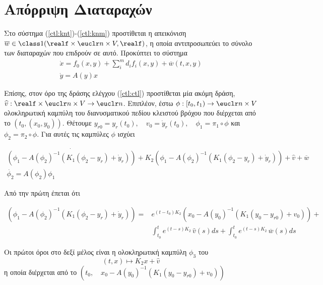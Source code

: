 \section{Απόρριψη Διαταραχών}

\noindent Στο σύστημα (\ref{ctl:knt})-(\ref{ctl:knm}) προστίθεται η απεικόνιση
$\overline{w} \in \class 1(\realf\times\euclr n\times V,\realf)$, η οποία 
αντιπροσωπεύει το σύνολο των διαταραχών που επιδρούν σε αυτό. Προκύπτει το 
σύστημα
\begin{gather}
    \dot{x} = f_{0}(x, y) + \sum_{i}^{m}{d_{i}f_{i}}(x,y) + \overline{w}(t,x,y)
    \label{ctl:knt_} \\
    \dot{y} = A(y)x
    \label{ctl:knm_}   
\end{gather}

Επίσης, στον όρο της δράσης ελέγχου (\ref{ctl:ctl}) προστίθεται μία ακόμη δράση,
$\widehat{v}: \realf\times\euclr n\times V \rightarrow \euclr n$. Επιπλέον,
έστω $\phi:[t_0,t_1)\rightarrow \euclr n \times V$ ολοκληρωτική καμπύλη του
διανυσματικού πεδίου κλειστού βρόχου που διέρχεται από το $\left(t_0,(x_0,y_0)
\right)$. Θέτουμε $y_{r0} = y_r(t_0),\quad v_0 = \dot{y}_r(t_0),\quad \phi_1 = 
\pi_1 \circ \phi$ και $\phi_2 = \pi_2 \circ \phi$. Για αυτές τις καμπύλες $\phi$
ισχύει

\begin{gather}
    \dot{\left(\phi_1 - A(\phi_2)^{-1}\left(K_1(\phi_2 - y_r) +\dot{y}_r\right)
    \right)} + K_2\left(\phi_1 - A(\phi_2)^{-1}\left(K_1(\phi_2 - y_r) + 
    \dot{y}_r\right)\right) + \widehat{v} + \overline{w}
    \label{ctl:dphi1}\\
    \dot{\phi_2} = A(\phi_2)\phi_1
    \label{ctl:dphi2}
\end{gather}

Από την πρώτη έπεται ότι

\begin{equation}
    \begin{split}
        \left(\phi_1 - A(\phi_2)^{-1}\left(K_1(\phi_2 - y_r) +\dot{y}_r\right)
        \right) =& e^{(t-t_0)K_2} \left(x_0 - A(y_0)^{-1}\left(K_1(y_0 - y_{r0})
         + v_0\right)\right) +\\&\int_{t_0}^{t}{e^{(t-s)K_2}\,\widehat{v}(s)} ds
         + \int_{t_0}^{t}{e^{(t-s)K_2}\,\overline{w}(s)} ds
    \end{split}
    \label{ctl:phi1}
\end{equation}

Οι πρώτοι όροι στο δεξί μέλος είναι η ολοκληρωτική καμπύλη $\phi_3$ του
\begin{equation*}
    (t,x) \mapsto K_2x+\widehat{v}
\end{equation*}
η οποία διέρχεται από το $\left(t_0,\quad x_0 - A(y_0)^{-1}\left(K_1 (y_0 - 
y_{r0})+v_0\right)\right)$

